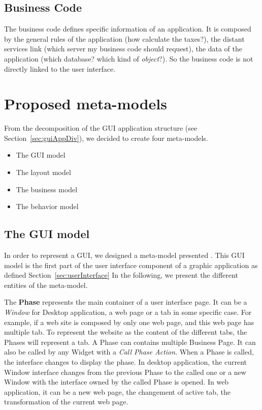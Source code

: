 \documentclass[conference]{IEEEtran}
\begin{document}
\subsection{Business Code}
\label{sec:businessCode}

The business code defines specific information of an application.
It is composed by the general rules of the application
    (how calculate the taxes?),
    the distant services link (which server my business code should request),
    the data of the application (which database? which kind of \textit{object}?).
So the business code is not directly linked to the user interface. 

\section{Proposed meta-models}
\label{sec:contribution}

From the decomposition of the GUI application structure (see Section~\ref{sec:guiAppDiv}),
    we decided to create four meta-models.

\begin{itemize}
    \item The GUI model
    \item The layout model
    \item The business model
    \item The behavior model
\end{itemize}


\subsection{The GUI model}
\label{sec:guiModel}

In order to represent a GUI, we designed a meta-model presented .
This GUI model is the first part of the user interface component of
    a graphic application as defined Section~\ref{sec:userInterface}
In the following, we present the different entities of the meta-model.



The \textbf{Phase} represents the main container of a user interface page.
It can be a \textit{Window} for Desktop application,
    a web page or a tab in some specific case.
For example, 
    if a web site is composed by only one web page, 
    and this web page has multiple tab.
To represent the website as the content of the different tabs, 
    the Phases will represent a tab.
A Phase can contains multiple Business Page.
It can also be called by any Widget with a \textit{Call Phase Action}.
When a Phase is called, the interface changes to display the phase.
In desktop application, the current Window interface changes from the previous Phase to 
    the called one or a new Window with the interface owned by the called Phase is opened.
In web application, it can be a new web page, the changement of active tab, the transformation of the current web page. 
\end{document}
